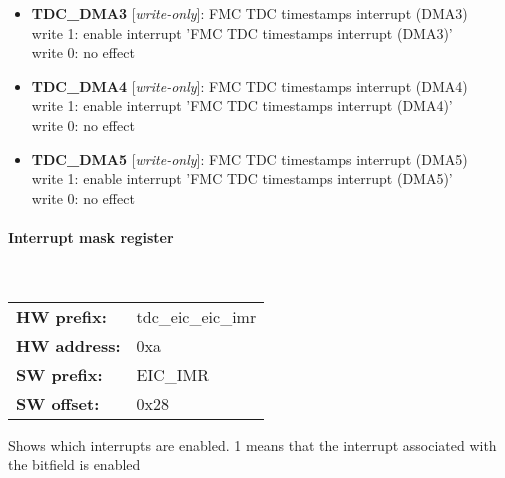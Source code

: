 \begin{itemize}
\begin{small}
\\
write 1: enable interrupt 'FMC TDC timestamps interrupt (DMA2)'\\write 0: no effect
\end{small}
\item \begin{small}
{\bf 
TDC\_DMA3
} [\emph{write-only}]: FMC TDC timestamps interrupt (DMA3)
\\
write 1: enable interrupt 'FMC TDC timestamps interrupt (DMA3)'\\write 0: no effect
\end{small}
\item \begin{small}
{\bf 
TDC\_DMA4
} [\emph{write-only}]: FMC TDC timestamps interrupt (DMA4)
\\
write 1: enable interrupt 'FMC TDC timestamps interrupt (DMA4)'\\write 0: no effect
\end{small}
\item \begin{small}
{\bf 
TDC\_DMA5
} [\emph{write-only}]: FMC TDC timestamps interrupt (DMA5)
\\
write 1: enable interrupt 'FMC TDC timestamps interrupt (DMA5)'\\write 0: no effect
\end{small}
\end{itemize}
\paragraph*{Interrupt mask register}\mbox{}\\\vskip 6pt
\begin{tabular}{l l }
{\bf HW prefix:}  & tdc\_eic\_eic\_imr\\
{\bf HW address:}  & 0xa\\
{\bf SW prefix:}  & EIC\_IMR\\
{\bf SW offset:}  & 0x28\\
\end{tabular}

\vspace{12pt}
Shows which interrupts are enabled. 1 means that the interrupt associated with the bitfield is enabled


